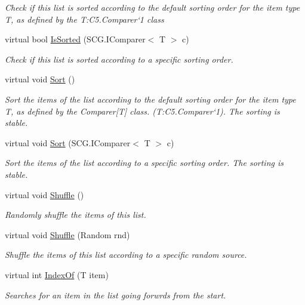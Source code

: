 \begin{DoxyCompactItemize}
\begin{DoxyCompactList}\small\item\em Check if this list is sorted according to the default sorting order for the item type T, as defined by the T\+:\+C5.\+Comparer`1 class \end{DoxyCompactList}\item 
virtual bool \hyperlink{class_c5_1_1_linked_list_a7cd3044aa3b164fbec60641619982507}{Is\+Sorted} (S\+C\+G.\+I\+Comparer$<$ T $>$ c)
\begin{DoxyCompactList}\small\item\em Check if this list is sorted according to a specific sorting order. \end{DoxyCompactList}\item 
virtual void \hyperlink{class_c5_1_1_linked_list_a2397bf5e01a48b7e0f3beb3c2c1e5c93}{Sort} ()
\begin{DoxyCompactList}\small\item\em Sort the items of the list according to the default sorting order for the item type T, as defined by the Comparer\mbox{[}T\mbox{]} class. (T\+:\+C5.\+Comparer`1). The sorting is stable. \end{DoxyCompactList}\item 
virtual void \hyperlink{class_c5_1_1_linked_list_a114f8851c4d329bc15781bd19dba88e8}{Sort} (S\+C\+G.\+I\+Comparer$<$ T $>$ c)
\begin{DoxyCompactList}\small\item\em Sort the items of the list according to a specific sorting order. The sorting is stable. \end{DoxyCompactList}\item 
virtual void \hyperlink{class_c5_1_1_linked_list_a4b802453e0f213f96996e6ddcfa8a26e}{Shuffle} ()
\begin{DoxyCompactList}\small\item\em Randomly shuffle the items of this list. \end{DoxyCompactList}\item 
virtual void \hyperlink{class_c5_1_1_linked_list_af642242c7f5fcac406c1095a9d618578}{Shuffle} (Random rnd)
\begin{DoxyCompactList}\small\item\em Shuffle the items of this list according to a specific random source. \end{DoxyCompactList}\item 
virtual int \hyperlink{class_c5_1_1_linked_list_a4dc305430081a02d96b65c285a61be7b}{Index\+Of} (T item)
\begin{DoxyCompactList}\small\item\em Searches for an item in the list going forwrds from the start. \end{DoxyCompactList}\item 

\end{DoxyCompactItemize}

